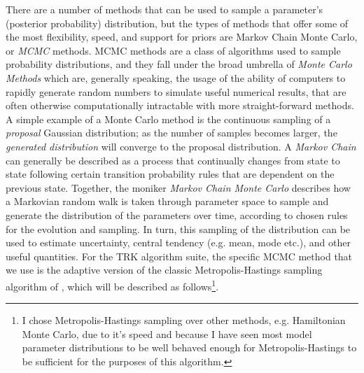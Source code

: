 There are a number of methods that can be used to sample a parameter's (posterior probability) distribution, but the types of methods that offer some of the most flexibility, speed, and support for priors are  Markov Chain Monte Carlo, or \textit{MCMC} methods. MCMC methods are a class of algorithms used to sample probability distributions, and they fall under the broad umbrella of \textit{Monte Carlo Methods} which are, generally speaking, the usage of the ability of computers to rapidly generate random numbers to simulate useful numerical results, that are often otherwise computationally intractable with more straight-forward methods. A simple example of a Monte Carlo method is the continuous sampling of a \textit{proposal} Gaussian distribution; as the number of samples becomes larger, the \textit{generated distribution} will converge to the proposal distribution. A \textit{Markov Chain} can generally be described as a process that continually changes from state to state following certain transition probability rules that are dependent on the previous state. Together, the moniker \textit{Markov Chain Monte Carlo} describes how a Markovian random walk is taken through parameter space to sample and generate the distribution of the parameters over time, according to chosen rules for the evolution and sampling. In turn, this sampling of the distribution can be used to estimate uncertainty, central tendency (e.g. mean, mode etc.), and other useful quantities. For the TRK algorithm suite, the specific MCMC method that we use is the adaptive version of the classic Metropolis-Hastings sampling algorithm of \textcite{hastings1970monte}, which will be described as follows\footnote{I chose Metropolis-Hastings sampling over other methods, e.g. Hamiltonian Monte Carlo, due to it's speed and because I have seen most model parameter distributions to be well behaved enough for Metropolis-Hastings to be sufficient for the purposes of this algorithm.}.

